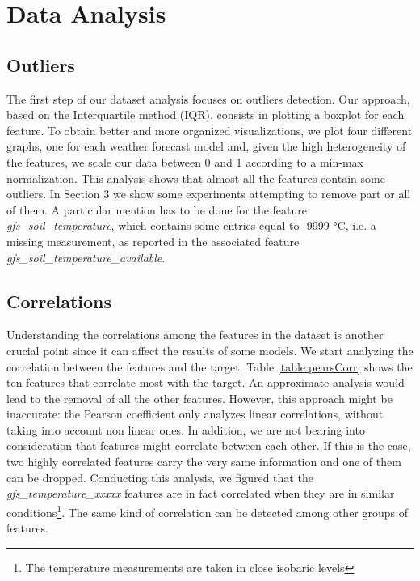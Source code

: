 \documentclass{article}
\begin{document}
\section{Data Analysis}
    \subsection{Outliers}
    The first step of our dataset analysis focuses on outliers detection. Our approach, based on the Interquartile method (IQR), consists in plotting a boxplot for each feature. To obtain better and more organized visualizations, we plot four different graphs, one for each weather forecast model and, given the high heterogeneity of the features, we scale our data between 0 and 1 according to a min-max normalization. This analysis shows that almost all the features contain some outliers. In Section 3 we show some experiments attempting to remove part or all of them. A particular mention has to be done for the feature \textit{gfs\_soil\_temperature}, which contains some entries equal to -9999 °C, i.e. a missing measurement, as reported in the associated feature \textit{gfs\_soil\_temperature\_available}.
    
    \subsection{Correlations}
    Understanding the correlations among the features in the dataset is another crucial point since it can affect the results of some models. We start analyzing the correlation between the features and the target. Table \ref{table:pearsCorr} shows the ten features that correlate most with the target. An approximate analysis would lead to the removal of all the other features. However, this approach might be inaccurate: the Pearson coefficient only analyzes linear correlations, without taking into account non linear ones. In addition, we are not bearing into consideration that features might correlate between each other. If this is the case, two highly correlated features carry the very same information and one of them can be dropped. Conducting this analysis, we figured that the \textit{gfs\_temperature\_xxxxx} features are in fact correlated when they are in similar conditions\footnote{The temperature measurements are taken in close isobaric levels}. The same kind of correlation can be detected among other groups of features.  
\end{document}

